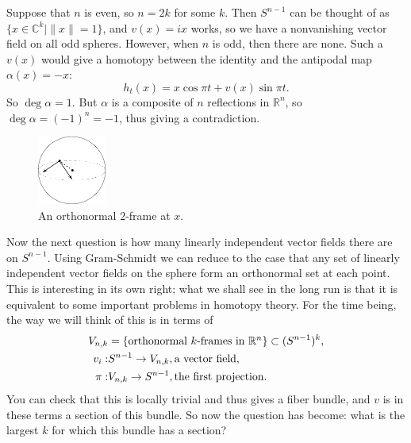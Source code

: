 \documentclass{article}
\newcommand{\C}{\mathbb{C}}
\newcommand{\R}{\mathbb{R}}
\begin{document}
Suppose that $n$ is even, so $n = 2k$ for some $k$.  Then $S^{n-1}$ can be thought of as $\{x \in \C^k \mid \|x\| = 1\}$, and $v(x) = ix$ works, so we have a nonvanishing vector field on all odd spheres.  However, when $n$ is odd, then there are none.  Such a $v(x)$ would give a homotopy between the identity and the antipodal map $\alpha(x) = -x$: \[h_t(x) = x \cos \pi t + v(x) \sin \pi t.\]  So $\deg \alpha = 1$.  But $\alpha$ is a composite of $n$ reflections in $\R^n$, so $\deg \alpha = (-1)^n = -1$, thus giving a contradiction.

\begin{figure}
\centering\includegraphics[width=0.2\textwidth]{figures/fig2.pdf}
\caption{\small An orthonormal $2$-frame at $x$.}
\end{figure}
Now the next question is how many linearly independent vector fields there are on $S^{n-1}$.  Using Gram-Schmidt we can reduce to the case that any set of linearly independent vector fields on the sphere form an orthonormal set at each point.  This is interesting in its own right; what we shall see in the long run is that it is equivalent to some important problems in homotopy theory.  For the time being, the way we will think of this is in terms of
\begin{align*}
V_{n, k} & = \{\hbox{orthonormal $k$-frames in $\R^n$}\} \subset (S^{n-1})^k, \\
v_i: & S^{n-1} \to V_{n, k}, \hbox{a vector field}, \\ %
\pi: & V_{n, k} \to S^{n-1}, \hbox{the first projection}.
\end{align*}
You can check that this is locally trivial and thus gives a fiber bundle, and $v$ is in these terms a section of this bundle.  So now the question has become: what is the largest $k$ for which this bundle has a section?
\end{document}
